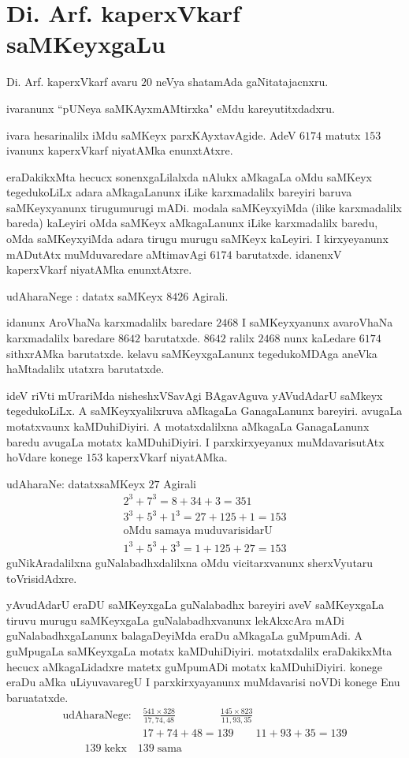 \chapter{Di. Arf. kaperxVkarf saMKeyxgaLu}

Di. Arf. kaperxVkarf avaru $20$\; neVya shatamAda gaNitatajacnxru.

ivaranunx ``pUNeya saMKAyxmAMtirxka" eMdu kareyutitxdadxru.

ivara hesarinalilx iMdu saMKeyx parxKAyxtavAgide. AdeV $6174$ matutx $153$ ivanunx kaperxVkarf niyatAMka enunxtAtxre.

eraDakikxMta hecucx sonenxgaLilalxda nAlukx aMkagaLa oMdu saMKeyx tegedukoLiLx adara aMkagaLanunx iLike karxmadalilx bareyiri baruva saMKeyxyanunx tirugumurugi mADi. modala saMKeyxyiMda (ilike karxmadalilx bareda) kaLeyiri oMda saMKeyx aMkagaLanunx iLike karxmadalilx baredu, oMda saMKeyxyiMda adara tirugu murugu saMKeyx kaLeyiri. I kirxyeyanunx mADutAtx muMduvaredare aMtimavAgi $6174$ barutatxde. idanenxV kaperxVkarf niyatAMka enunxtAtxre.

udAharaNege : datatx saMKeyx $8426$ Agirali.

idanunx AroVhaNa karxmadalilx baredare $2468$ I saMKeyxyanunx avaroVhaNa karxmadalilx baredare $8642$ barutatxde. $8642$\; ralilx $2468$ nunx kaLedare $6174$ sithxrAMka barutatxde. kelavu saMKeyxgaLanunx tegedukoMDAga aneVka haMtadalilx utatxra barutatxde.

ideV riVti mUrariMda nisheshxVSavAgi BAgavAguva yAVudAdarU saMkeyx tegedukoLiLx. A saMKeyxyalilxruva aMkagaLa GanagaLanunx bareyiri. avugaLa motatxvaunx kaMDuhiDiyiri. A motatxdalilxna aMkagaLa GanagaLanunx baredu avugaLa motatx kaMDuhiDiyiri. I parxkirxyeyanux muMdavarisutAtx hoVdare konege $153$ kaperxVkarf niyatAMka. 

udAharaNe: datatxsaMKeyx $27$ Agirali
\begin{gather*}
2^3+7^3 = 8+34+3 = 351\\
3^3+5^3+1^3 = 27+125+1 = 153\\
\text{oMdu samaya muduvarisidarU}\\
1^3+5^3+3^3 = 1+125+27 = 153
\end{gather*}
guNikAradalilxna guNalabadhxdalilxna oMdu vicitarxvanunx sherxVyutaru toVrisidAdxre.

yAvudAdarU eraDU saMKeyxgaLa guNalabadhx bareyiri aveV saMKeyxgaLa tiruvu murugu saMKeyxgaLa guNalabadhxvanunx lekAkxcAra mADi guNalabadhxgaLanunx balagaDeyiMda eraDu aMkagaLa guMpumAdi. A guMpugaLa saMKeyxgaLa motatx kaMDuhiDiyiri. motatxdalilx eraDakikxMta hecucx aMkagaLidadxre matetx guMpumADi motatx kaMDuhiDiyiri. konege eraDu aMka uLiyuvavaregU I parxkirxyayanunx muMdavarisi noVDi konege Enu baruatatxde.
\begin{gather*}
\text {udAharaNege:}\quad \frac{541\times 328}{17,74,48} \qquad\qquad \frac{145 \times 823}{11,93,35}\\
\phantom{\text{udAharaNege:}}\quad 17+74+48 = 139 \qquad 11+93+35 = 139\\
\qquad 139\;\text{kekx} \quad 139\; \text{sama}
\end{gather*}
